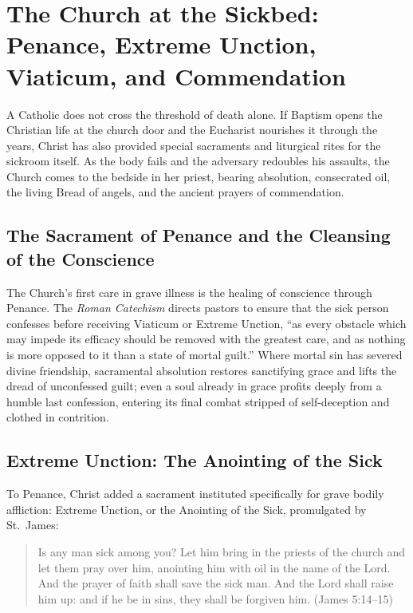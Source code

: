 \section{The Church at the Sickbed: Penance, Extreme Unction, Viaticum, and Commendation}

A Catholic does not cross the threshold of death alone. If Baptism opens the Christian life at the church door and the Eucharist nourishes it through the years, Christ has also provided special sacraments and liturgical rites for the sickroom itself. As the body fails and the adversary redoubles his assaults, the Church comes to the bedside in her priest, bearing absolution, consecrated oil, the living Bread of angels, and the ancient prayers of commendation.

\subsection{The Sacrament of Penance and the Cleansing of the Conscience}

The Church's first care in grave illness is the healing of conscience through Penance. The \emph{Roman Catechism} directs pastors to ensure that the sick person confesses before receiving Viaticum or Extreme Unction, ``as every obstacle which may impede its efficacy should be removed with the greatest care, and as nothing is more opposed to it than a state of mortal guilt.'' Where mortal sin has severed divine friendship, sacramental absolution restores sanctifying grace and lifts the dread of unconfessed guilt; even a soul already in grace profits deeply from a humble last confession, entering its final combat stripped of self-deception and clothed in contrition.

\subsection{Extreme Unction: The Anointing of the Sick}

To Penance, Christ added a sacrament instituted specifically for grave bodily affliction: Extreme Unction, or the Anointing of the Sick, promulgated by St.\ James:

\begin{quote}
Is any man sick among you? Let him bring in the priests of the church and let them pray over him, anointing him with oil in the name of the Lord. And the prayer of faith shall save the sick man. And the Lord shall raise him up: and if he be in sins, they shall be forgiven him. (James 5:14--15)
\end{quote}

